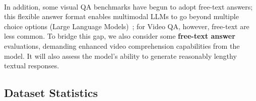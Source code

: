 \\
In addition, some visual QA benchmarks \cite{Whoop} have begun to adopt free-text answers; this flexible answer format enables multimodal LLMs to go beyond multiple choice options (Large Language Models)~\cite{2023videochat,maaz2023videochatgpt}; for Video QA, however, free-text %
are less common. To bridge this gap, we also consider some \textbf{free-text answer} evaluations, demanding enhanced video comprehension capabilities from the model. It will also assess the model's ability to generate reasonably lengthy textual responses.
% 



\subsection{Dataset Statistics}
